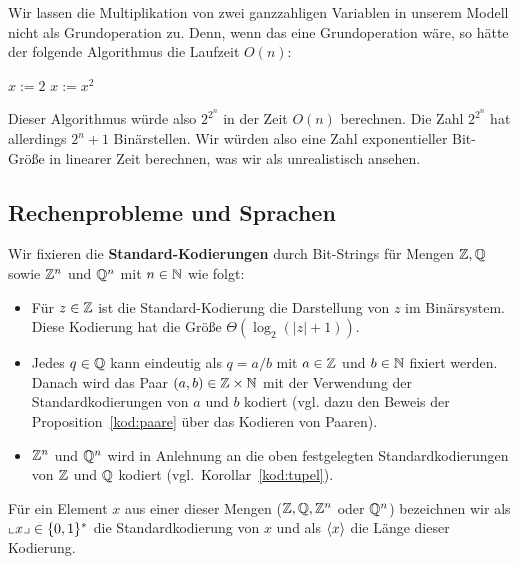 
\begin{bem} 
Wir lassen die Multiplikation von zwei ganzzahligen Variablen in unserem Modell nicht als Grundoperation zu. Denn, wenn das eine Grundoperation wäre, so hätte der folgende Algorithmus die Laufzeit $O(n)$: 

\begin{center}
	\begin{algorithmic}
		\STATE $x:=2$
		\STATE $x:=x^2$
		\ENDFOR
	\end{algorithmic}
\end{center}

Dieser Algorithmus würde also $2^{2^n}$ in der Zeit $O(n)$ berechnen. Die Zahl $2^{2^n}$ hat allerdings $2^n+1$ Binärstellen. Wir würden also eine Zahl exponentieller Bit-Größe in linearer Zeit berechnen, was wir als unrealistisch ansehen. 
\end{bem}


\subsection{Rechenprobleme und Sprachen}
\label{sect:rechenprobleme}

\begin{defn}
	Wir fixieren die \textbf{Standard-Kodierungen} durch Bit-Strings für Mengen $\mathbb{Z}, \mathbb{Q}$ sowie $\mathbb{Z}^n$ und $\mathbb{Q}^n$ mit $n \in \mathbb{N}$ wie folgt: 
	\begin{itemize}
		\item Für $z \in \mathbb{Z}$ ist die Standard-Kodierung die Darstellung von $z$ im Binärsystem. Diese Kodierung hat die Größe $\Theta(\log_2 (|z|+1))$. 
		\item Jedes $q \in \mathbb{Q}$ kann eindeutig als $q = a/b$ mit $a \in \mathbb{Z}$ und $b \in \mathbb{N}$ fixiert werden. Danach wird das Paar $(a,b) \in \mathbb{Z} \times \mathbb{N}$ mit der Verwendung der Standardkodierungen von $a$ und $b$ kodiert (vgl. dazu den Beweis der Proposition~\ref{kod:paare} über das Kodieren von Paaren). 
		\item $\mathbb{Z}^n$ und $\mathbb{Q}^n$ wird in Anlehnung an die oben festgelegten Standardkodierungen von $\mathbb{Z}$ und $\mathbb{Q}$ kodiert (vgl.~Korollar~\ref{kod:tupel}). 
	\end{itemize} 
	Für ein Element $x$ aus einer dieser Mengen ($\mathbb{Z},\mathbb{Q}, \mathbb{Z}^n$ oder $\mathbb{Q}^n$) bezeichnen wir als ${\llcorner x\lrcorner} \in \{0,1\}^\ast$ die Standardkodierung von $x$ und als $\langle x \rangle$ die Länge dieser Kodierung. 
\end{defn} 

